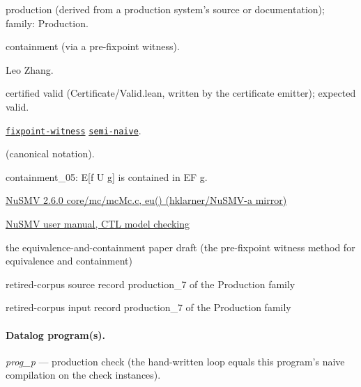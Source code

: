 \documentclass[10pt]{article}
\begin{document}
\begin{description}[leftmargin=2.6cm,style=nextline,itemsep=1pt]

\item[Category] production (derived from a production system's source or documentation); family: Production.

\item[Kind] containment (via a pre-fixpoint witness).

\item[Contributors] Leo Zhang.

\item[Status] certified valid (Certificate/Valid.lean, written by the certificate emitter); expected valid.

\item[Tags] \hyperref[tag:fixpoint-witness]{\texttt{fixpoint-witness}} \hyperref[tag:semi-naive]{\texttt{semi-naive}}.

\item[Input]  (canonical notation).

\item[Summary] containment\_05: E[f U g] is contained in EF g.

\item[Sources] {\raggedright \href{https://github.com/hklarner/NuSMV-a}{NuSMV 2.6.0 core/mc/mcMc.c, eu() (hklarner/NuSMV-a mirror)} \par \href{https://nusmv.fbk.eu/userman/v21/nusmv_2.html}{NuSMV user manual, CTL model checking} \par the equivalence-and-containment paper draft (the pre-fixpoint witness method for equivalence and containment) \par retired-corpus source record production\_7 of the Production family \par retired-corpus input record production\_7 of the Production family\par}

\end{description}

\paragraph{Datalog program(s).}

{\raggedright\textit{prog\_p} --- production check (the hand-written loop equals this program's naive compilation on the check instances).\par}
\end{document}
